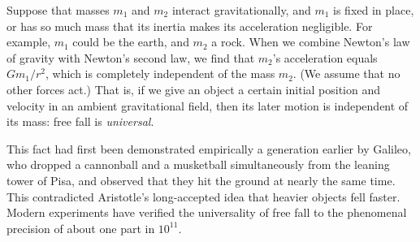 Suppose that masses $m_1$ and $m_2$ interact gravitationally, and
$m_1$ is fixed in place, or has so much mass that its inertia makes
its acceleration negligible. For example, $m_1$ could be the earth,
and $m_2$ a rock. When we combine Newton's law of gravity with
Newton's second law, we find that $m_2$'s acceleration equals
$Gm_1/r^2$, which is completely independent of the mass $m_2$. (We
assume that no other forces act.) That is, if we give an object a
certain initial position and velocity in an ambient gravitational
field, then its later motion is independent of its mass: free fall is
\emph{universal}.

This fact had first been demonstrated empirically a generation earlier
by Galileo, who dropped a cannonball and a musketball simultaneously
from the leaning tower of Pisa, and observed that they hit the ground
at nearly the same time. This contradicted Aristotle's long-accepted
idea that heavier objects fell faster.  Modern experiments have
verified the universality of free fall to the phenomenal precision of
about one part in $10^{11}$. 
